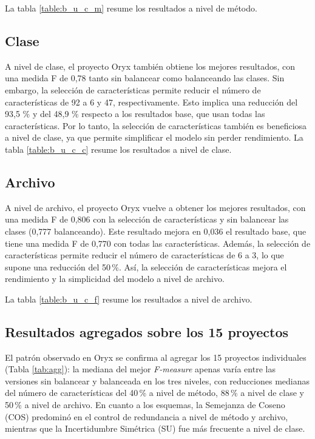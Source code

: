 La tabla \ref{table:b_u_c_m} resume los resultados a nivel de método. 


\subsection{Clase}
A nivel de clase, el proyecto Oryx también obtiene los mejores resultados, con una medida F de 0,78 tanto sin balancear como balanceando las clases. Sin embargo, la selección de características permite reducir el número de características de 92 a 6 y 47, respectivamente. Esto implica una reducción del 93,5 \% y del 48,9 \% respecto a los resultados base, que usan todas las características. Por lo tanto, la selección de características también es beneficiosa a nivel de clase, ya que permite simplificar el modelo sin perder rendimiento.
La tabla \ref{table:b_u_c_c} resume los resultados a nivel de clase.


\subsection{Archivo}
A nivel de archivo, el proyecto Oryx vuelve a obtener los mejores resultados, con una medida F de 0,806 con la selección de características y sin balancear las clases (0,777 balanceando). Este resultado mejora en 0,036 el resultado base, que tiene una medida F de 0,770 con todas las características. Además, la selección de características permite reducir el número de características de 6 a 3, lo que supone una reducción del 50\,\%. Así, la selección de características mejora el rendimiento y la simplicidad del modelo a nivel de archivo.

La tabla \ref{table:b_u_c_f} resume los resultados a nivel de archivo.


\subsection{Resultados agregados sobre los 15 proyectos}

El patrón observado en Oryx se confirma al agregar los 15 proyectos individuales (Tabla \ref{tab:agg}): la mediana del mejor \textit{F-measure} apenas varía entre las versiones sin balancear y balanceada en los tres niveles, con reducciones medianas del número de características del 40\,\% a nivel de método, 88\,\% a nivel de clase y 50\,\% a nivel de archivo. En cuanto a los esquemas, la Semejanza de Coseno (COS) predominó en el control de redundancia a nivel de método y archivo, mientras que la Incertidumbre Simétrica (SU) fue más frecuente a nivel de clase.

